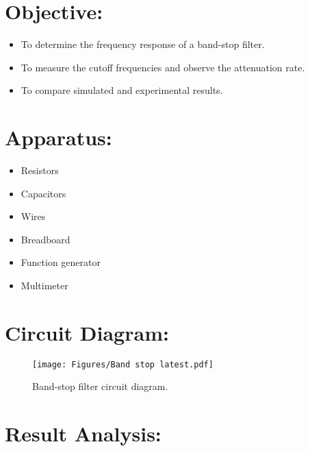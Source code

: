 \documentclass[a4paper, 12pt]{extarticle}
\begin{document}
\section{Objective:}
    \begin{itemize}
        \item To determine the frequency response of a band-stop filter.
        \item To measure the cutoff frequencies and observe the attenuation rate.
        \item To compare simulated and experimental results.
    \end{itemize}

\section{Apparatus:}
\begin{minipage}[t]{0.45\linewidth}
    \begin{itemize}
        \item Resistors
        \item Capacitors
        \item Wires
    \end{itemize}
\end{minipage}
\hfill
\begin{minipage}[t]{0.45\linewidth}
    \begin{itemize}
        \item Breadboard
        \item Function generator
        \item Multimeter
    \end{itemize}
\end{minipage}

\section{Circuit Diagram:}
\begin{figure}[htbp]
    \centering
    \texttt{[image: Figures/Band stop latest.pdf]}
    \caption{Band-stop filter circuit diagram.}
    \label{fig:Band_Stop_Filter_Circuit}
\end{figure}

\newpage
\restoregeometry
{}

\section{Result Analysis:}
\end{document}
